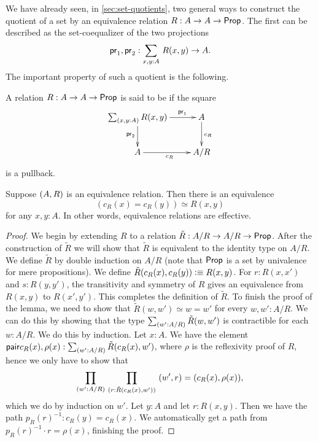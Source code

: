 We have already seen, in \autoref{sec:set-quotients}, two general ways to construct the quotient of a set by an equivalence relation $R:A\to A\to\mathsf{Prop}$.
The first can be described as the set-coequalizer of the two projections
\[\proj1,\proj2:\sm{x,y:A} R(x,y)\to A.\]
The important property of such a quotient is the following.

\begin{defn}
A relation $R:A\to A\to\mathsf{Prop}$ is said to be  if the square
\begin{equation*}
  \xymatrix{
    {\sm{x,y:A} R (x,y)}
    \ar[r]^(0.7){\proj1}
    \ar[d]_{\proj2}
    &
    {A}
    \ar[d]^{c_R}
    \\
    {A}
    \ar[r]_{c_R}
    &
    {A/R}
    }
\end{equation*}
is a pullback. 
\end{defn}

\begin{lem}\label{lem:sets_exact}
Suppose ${(A,R)}$ is an equivalence relation. Then there is an equivalence
\begin{equation*}
(c_R(x)= c_R(y))\simeq R(x,y)
\end{equation*}
for any $x,y:A$. In other words, equivalence relations are effective.
\end{lem}

\begin{proof}
We begin by extending $R$ to a relation $\tilde{R}:A/R\to A/R\to\mathsf{Prop}$. After
the construction of $\tilde{R}$ we will show that $\tilde{R}$ is equivalent
to the identity type on $A/R$. We define $\tilde{R}$ by double induction on
$A/R$ (note that $\mathsf{Prop}$ is a set by univalence for mere propositions). We
define $\tilde{R}(c_R(x),c_R(y)) \vcentcolon\equiv R(x,y)$. For $r:R(x,x')$ and $s:R(y,y')$,
the transitivity and symmetry 
of $R$ gives an equivalence from $R(x,y)$ to $R(x',y')$. This completes the
definition of $\tilde{R}$. To finish the proof of the lemma, we need
to show that $\tilde{R}(w,w')\simeq w= w'$ for every $w,w':A/R$. We can
do this by showing that the type $\sm{w':A/R} \tilde{R}(w,w')$ is contractible for
each $w:A/R$. We do this by induction. Let $x:A$. We have the element
$\pair{c_R(x),\rho(x)}:\sm{w':A/R} \tilde{R}(c_R(x),w')$, where $\rho$ is
the reflexivity proof of $R$, hence we only
have to show that
\begin{equation*}
\prd{w':A/R}{r:\tilde{R}(c_R(x),w')} \pairr{w',r}=\pairr{c_R(x),\rho(x)},
\end{equation*}
which we do by induction on $w'$. Let $y:A$ and let $r:R(x,y)$. Then we have
the path $p_R(r)^{-1}:c_R(y)= c_R(x)$. We automatically get a path from
$p_R(r)^{-1}\cdot r=\rho(x)$, finishing the proof.
\end{proof}

